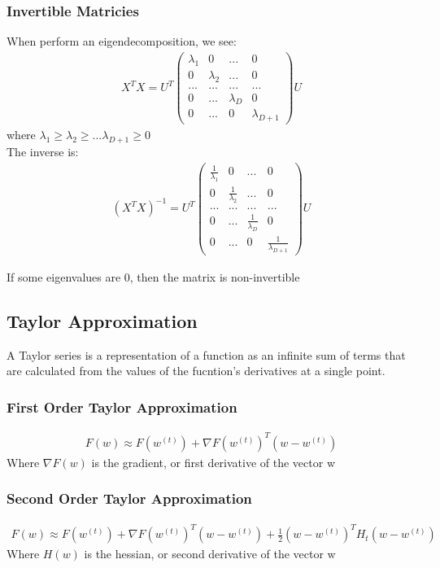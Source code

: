 \documentclass{article}
\begin{document}
\subsubsection{Invertible Matricies}
When perform an eigendecomposition, we see:
\begin{align*}
X^TX = U^T \left(\begin{array}{cccc}
\lambda_1 & 0 & ... & 0\\
0 & \lambda_2 & ... & 0\\
... & ... & ... & ...\\
0 & ... & \lambda_D & 0\\
0 & ... & 0 & \lambda_{D+1}
\end{array}\right) U
\end{align*}
where $\lambda_1  \geq \lambda_2  \geq ... \lambda_{D+1}  \geq 0 $\\
The inverse is:
\begin{align*}
(X^TX)^{-1} = U^T \left(\begin{array}{cccc}
\frac{1}{\lambda_1} & 0 & ... & 0\\
0 & \frac{1}{\lambda_2} & ... & 0\\
... & ... & ... & ...\\
0 & ... & \frac{1}{\lambda_D} & 0\\
0 & ... & 0 & \frac{1}{\lambda_{D+1}}
\end{array}\right) U
\end{align*}

If some eigenvalues are 0, then the matrix is non-invertible

\subsection{Taylor Approximation}
A Taylor series is a representation of a function as an infinite sum of terms that are calculated from the values of the fucntion's derivatives at a single point.
\subsubsection{First Order Taylor Approximation}
\begin{align*}
F(w) \approx F(w^{(t)}) + \nabla F(w^{(t)})^T(w-w^{(t)})
\end{align*}
Where $\nabla F(w)$ is the gradient, or first derivative of the vector w
\subsubsection{Second Order Taylor Approximation}
\begin{align*}
F(w) \approx F(w^{(t)}) + \nabla F(w^{(t)})^T(w-w^{(t)}) + \frac{1}{2}(w-w^{(t)})^T  H_t(w-w^{(t)})
\end{align*}
Where $H(w)$ is the hessian, or second derivative of the vector w
\end{document}
